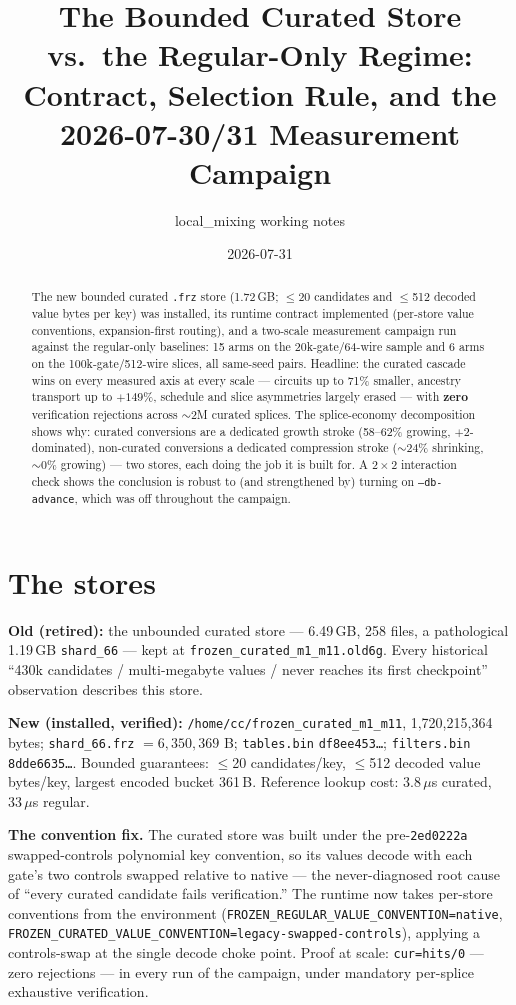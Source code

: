 \documentclass[11pt]{article}
\title{The Bounded Curated Store vs.\ the Regular-Only Regime:\\
Contract, Selection Rule, and the 2026-07-30/31 Measurement Campaign}
\author{local\_mixing working notes}
\date{2026-07-31}
\newcommand{\code}[1]{\texttt{#1}}
\begin{document}
\maketitle

\begin{abstract}
The new bounded curated \code{.frz} store (1.72\,GB; $\le$20 candidates and
$\le$512 decoded value bytes per key) was installed, its runtime contract
implemented (per-store value conventions, expansion-first routing), and a
two-scale measurement campaign run against the regular-only baselines: 15
arms on the 20k-gate/64-wire sample and 6 arms on the 100k-gate/512-wire
slices, all same-seed pairs. Headline: the curated cascade wins on every
measured axis at every scale --- circuits up to 71\% smaller, ancestry
transport up to $+149\%$, schedule and slice asymmetries largely erased ---
with \textbf{zero} verification rejections across $\sim$2M curated splices.
The splice-economy decomposition shows why: curated conversions are a
dedicated growth stroke (58--62\% growing, $+2$-dominated), non-curated
conversions a dedicated compression stroke ($\sim$24\% shrinking,
$\sim$0\% growing) --- two stores, each doing the job it is built for. A
$2{\times}2$ interaction check shows the conclusion is robust to (and
strengthened by) turning on \code{--db-advance}, which was off throughout
the campaign.
\end{abstract}

\section{The stores}

\textbf{Old (retired):} the unbounded curated store --- 6.49\,GB, 258
files, a pathological 1.19\,GB \code{shard\_66} --- kept at
\code{frozen\_curated\_m1\_m11.old6g}. Every historical ``430k candidates /
multi-megabyte values / never reaches its first checkpoint'' observation
describes this store.

\textbf{New (installed, verified):} \code{/home/cc/frozen\_curated\_m1\_m11},
1{,}720{,}215{,}364 bytes; \code{shard\_66.frz} $= 6{,}350{,}369$ B;
\code{tables.bin} \code{df8ee453\ldots}; \code{filters.bin}
\code{8dde6635\ldots}. Bounded guarantees: $\le$20 candidates/key, $\le$512
decoded value bytes/key, largest encoded bucket 361\,B. Reference lookup
cost: 3.8\,$\mu$s curated, 33\,$\mu$s regular.

\textbf{The convention fix.} The curated store was built under the
pre-\code{2ed0222a} swapped-controls polynomial key convention, so its
values decode with each gate's two controls swapped relative to native ---
the never-diagnosed root cause of ``every curated candidate fails
verification.'' The runtime now takes per-store conventions from the
environment (\code{FROZEN\_REGULAR\_VALUE\_CONVENTION=native},
\code{FROZEN\_CURATED\_VALUE\_CONVENTION=legacy-swapped-controls}),
applying a controls-swap at the single decode choke point. Proof at scale:
\code{cur=hits/0} --- zero rejections --- in every run of the campaign,
under mandatory per-splice exhaustive verification.
\end{document}
